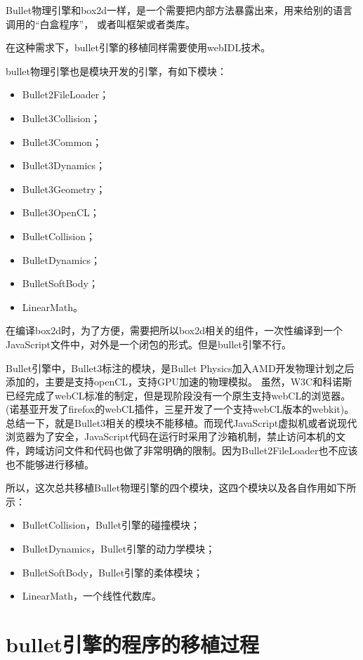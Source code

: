 Bullet物理引擎和box2d一样，是一个需要把内部方法暴露出来，用来给别的语言调用的“白盒程序”，
或者叫框架或者类库。

在这种需求下，bullet引擎的移植同样需要使用webIDL技术。

bullet物理引擎也是模块开发的引擎，有如下模块：

\begin{itemize}[itemindent=2em]
    \item Bullet2FileLoader；
    \item Bullet3Collision；
    \item Bullet3Common；
    \item Bullet3Dynamics；
    \item Bullet3Geometry；
    \item Bullet3OpenCL；
    \item BulletCollision；
    \item BulletDynamics；
    \item BulletSoftBody；
    \item LinearMath。
\end{itemize}

在编译box2d时，为了方便，需要把所以box2d相关的组件，一次性编译到一个JavaScript文件中，对外是一个闭包的形式。但是bullet引擎不行。

Bullet引擎中，Bullet3标注的模块，是Bullet Physics加入AMD开发物理计划之后添加的，主要是支持openCL，支持GPU加速的物理模拟。
虽然，W3C和科诺斯已经完成了webCL标准的制定，但是现阶段没有一个原生支持webCL的浏览器。(诺基亚开发了firefox的webCL插件，三星开发了一个支持webCL版本的webkit)。总结一下，就是Bullet3相关的模块不能移植。而现代JavaScript虚拟机或者说现代浏览器为了安全，JavaScript代码在运行时采用了沙箱机制，禁止访问本机的文件，跨域访问文件和代码也做了非常明确的限制。因为Bullet2FileLoader也不应该也不能够进行移植。

所以，这次总共移植Bullet物理引擎的四个模块，这四个模块以及各自作用如下所示：

\begin{itemize}[itemindent=2em]
    \item BulletCollision，Bullet引擎的碰撞模块；
    \item BulletDynamics，Bullet引擎的动力学模块；
    \item BulletSoftBody，Bullet引擎的柔体模块；
    \item LinearMath，一个线性代数库。
\end{itemize}


\section{bullet引擎的程序的移植过程}

